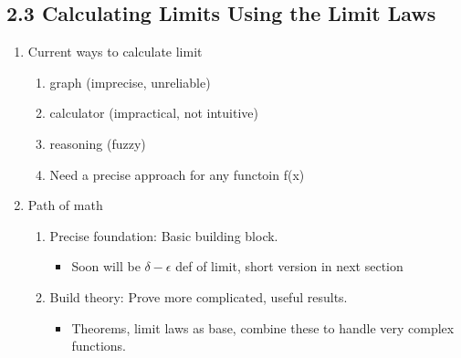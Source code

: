 \documentclass{article}
\begin{document}
\noindent \subsection{2.3 Calculating Limits Using the Limit Laws}
\begin{enumerate}

\item Current ways to calculate limit
\begin{enumerate}
\item graph (imprecise, unreliable)
\item  calculator (impractical, not intuitive)
\item  reasoning (fuzzy)
\item Need a precise approach for any functoin f(x)
\end{enumerate}


\item Path of math
\begin{enumerate}
\item Precise foundation: Basic building block.
\begin{itemize}
\item Soon will be $\delta - \epsilon$ def of limit, short version in next section
\end{itemize}  
\item Build theory: Prove more complicated, useful results.
\begin{itemize}
\item  Theorems, limit laws as base, combine these to handle very complex functions.
\end{itemize}
\end{enumerate}


\end{enumerate}
\end{document}
